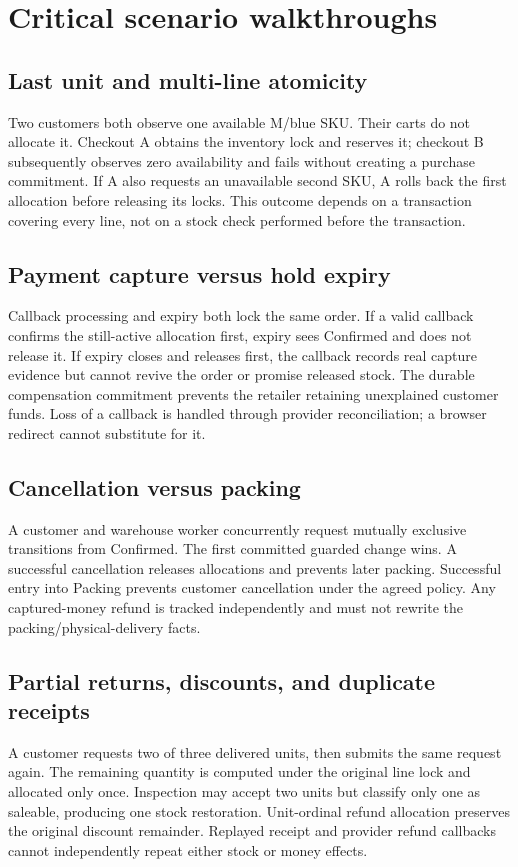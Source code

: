 \section{Critical scenario walkthroughs}
\subsection{Last unit and multi-line atomicity}
Two customers both observe one available M/blue SKU. Their carts do not allocate it. Checkout A obtains the inventory lock and reserves it; checkout B subsequently observes zero availability and fails without creating a purchase commitment. If A also requests an unavailable second SKU, A rolls back the first allocation before releasing its locks. This outcome depends on a transaction covering every line, not on a stock check performed before the transaction.

\subsection{Payment capture versus hold expiry}
Callback processing and expiry both lock the same order. If a valid callback confirms the still-active allocation first, expiry sees Confirmed and does not release it. If expiry closes and releases first, the callback records real capture evidence but cannot revive the order or promise released stock. The durable compensation commitment prevents the retailer retaining unexplained customer funds. Loss of a callback is handled through provider reconciliation; a browser redirect cannot substitute for it.

\subsection{Cancellation versus packing}
A customer and warehouse worker concurrently request mutually exclusive transitions from Confirmed. The first committed guarded change wins. A successful cancellation releases allocations and prevents later packing. Successful entry into Packing prevents customer cancellation under the agreed policy. Any captured-money refund is tracked independently and must not rewrite the packing/physical-delivery facts.

\subsection{Partial returns, discounts, and duplicate receipts}
A customer requests two of three delivered units, then submits the same request again. The remaining quantity is computed under the original line lock and allocated only once. Inspection may accept two units but classify only one as saleable, producing one stock restoration. Unit-ordinal refund allocation preserves the original discount remainder. Replayed receipt and provider refund callbacks cannot independently repeat either stock or money effects.

